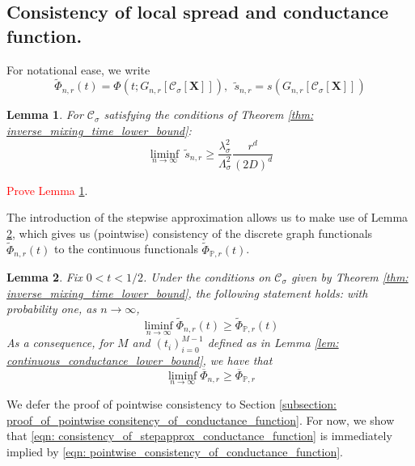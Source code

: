 \documentclass{article}
\newcommand{\1}{\mathbf{1}}
\newcommand{\Xbf}{\mathbf{X}}
\newcommand{\Pbb}{\mathbb{P}}
\newcommand{\Cset}{\mathcal{C}}
\newcommand{\Csig}{\Cset_{\sigma}}
\theoremstyle{aldenthm}
\newtheorem{lemma}{Lemma}
\begin{document}
\subsection{Consistency of local spread and conductance function.}
\label{sec: consistency}

For notational ease, we write 
\begin{equation*}
\widetilde{\Phi}_{n,r}(t) = \Phi(t; G_{n,r}[\Csig[\Xbf]]), ~~ \widetilde{s}_{n,r} = s(G_{n,r}[\Csig[\Xbf]])
\end{equation*}

\begin{lemma}
	\label{lem: local_spread_lower_bound}
	For $\Csig$ satisfying the conditions of Theorem \ref{thm: inverse_mixing_time_lower_bound}:
	\begin{equation*}
	\liminf_{n \to \infty}~ \widetilde{s}_{n,r} \geq \frac{\lambda_{\sigma}^2}{\Lambda_{\sigma}^2} \frac{r^d}{(2D)^d}
	\end{equation*}
\end{lemma}

\textcolor{red}{Prove Lemma \ref{lem: local_spread_lower_bound}}.

The introduction of the stepwise approximation allows us to make use of Lemma \ref{lem: consistency_of_conductance_function}, which gives us (pointwise) consistency of the discrete graph functionals $\widetilde{\Phi}_{n,r}(t)$ to the continuous functionals $\widetilde{\Phi}_{\Pbb,r}(t)$. 

\begin{lemma}
	\label{lem: consistency_of_conductance_function}
	Fix $0 < t < 1/2$. Under the conditions on $\Csig$ given by Theorem \ref{thm: inverse_mixing_time_lower_bound}, the following statement holds: with probability one, as $n \to \infty$,
	\begin{equation}
	\label{eqn: pointwise_consistency_of_conductance_function}
	\liminf_{n \to \infty} \widetilde{\Phi}_{n,r}(t) \geq \widetilde{\Phi}_{\Pbb,r}(t)
	\end{equation}
	As a consequence, for $M$ and $(t_i)_{i=0}^{M-1}$ defined as in Lemma \ref{lem: continuous_conductance_lower_bound}, we have that
	\begin{equation}
	\label{eqn: consistency_of_stepapprox_conductance_function}
	\liminf_{n \to \infty} \overline{\Phi}_{n,r} \geq \overline{\Phi}_{\Pbb,r}
	\end{equation}
\end{lemma}
We defer the proof of pointwise consistency to Section \ref{subsection: proof_of_pointwise consitency_of_conductance_function}. For now, we show that \eqref{eqn: consistency_of_stepapprox_conductance_function} is immediately implied by \eqref{eqn: pointwise_consistency_of_conductance_function}.
\end{document}
